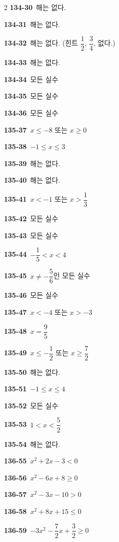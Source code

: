 \documentclass[10pt,a4paper]{article}
\begin{document}
\begin{multicols}{2}
\noindent\textbf{134-30}\ 해는 없다.\par
\noindent\textbf{134-31}\ 해는 없다.\par
\noindent\textbf{134-32}\ 해는 없다. (힌트 $\dfrac{1}{2}$, $\dfrac{3}{4}$, 없다.)\par
\noindent\textbf{134-33}\ 해는 없다.\par
\noindent\textbf{134-34}\ 모든 실수\par
\noindent\textbf{134-35}\ 모든 실수\par
\noindent\textbf{134-36}\ 모든 실수\par
\noindent\textbf{135-37}\ $x\le -8$ 또는 $x\ge 0$\par
\noindent\textbf{135-38}\ $-1\le x\le 3$\par
\noindent\textbf{135-39}\ 해는 없다.\par
\noindent\textbf{135-40}\ 해는 없다.\par
\noindent\textbf{135-41}\ $x<-1$ 또는 $x>\dfrac{1}{3}$\par
\noindent\textbf{135-42}\ 모든 실수\par
\noindent\textbf{135-43}\ 모든 실수\par
\noindent\textbf{135-44}\ $-\dfrac{1}{5}<x<4$\par
\noindent\textbf{135-45}\ $x\ne -\dfrac{5}{6}$인 모든 실수\par
\noindent\textbf{135-46}\ 모든 실수\par
\noindent\textbf{135-47}\ $x<-4$ 또는 $x>-3$\par
\noindent\textbf{135-48}\ $x=\dfrac{9}{5}$\par
\noindent\textbf{135-49}\ $x\le -\dfrac{1}{2}$ 또는 $x\ge\dfrac{7}{2}$\par
\noindent\textbf{135-50}\ 해는 없다.\par
\noindent\textbf{135-51}\ $-1\le x\le 4$\par
\noindent\textbf{135-52}\ 모든 실수\par
\noindent\textbf{135-53}\ $1<x<\dfrac{5}{2}$\par
\noindent\textbf{135-54}\ 해는 없다.\par
\noindent\textbf{136-55}\ $x^2+2x-3<0$\par
\noindent\textbf{136-56}\ $x^2-6x+8\ge 0$\par
\noindent\textbf{136-57}\ $x^2-3x-10>0$\par
\noindent\textbf{136-58}\ $x^2+8x+15\le 0$\par
\noindent\textbf{136-59}\ $-3x^2-\dfrac{7}{2}x+\dfrac{3}{2}\ge 0$\par

\end{multicols}
\end{document}
